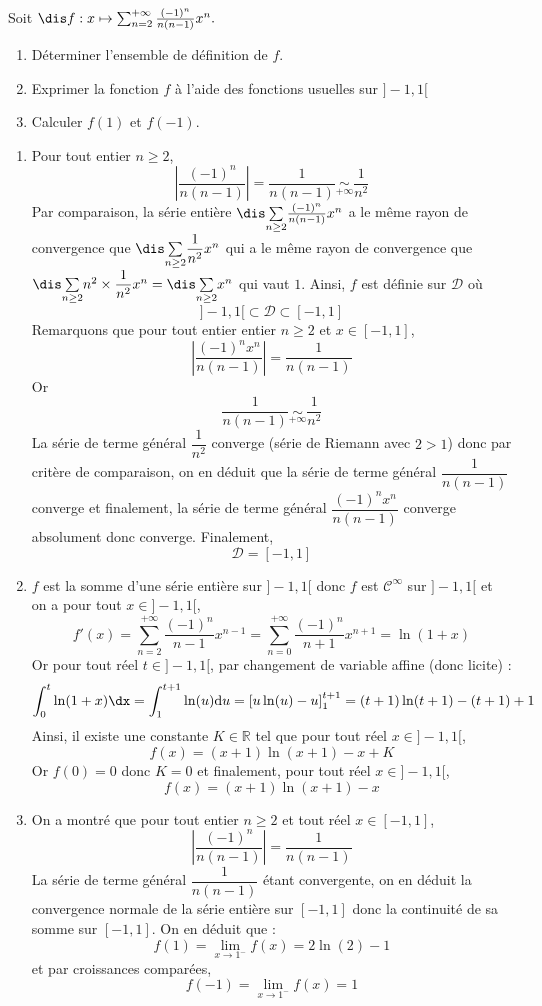\documentclass[a4paper,10pt]{report}
\newcommand{\Sum}[2]{\ensuremath{\textstyle{\sum\limits_{#1}^{#2}}}}
\begin{document}
\begin{Exercice}{} Soit $\dis f : x \mapsto \sum_{n = 2}^{ + \infty} \frac{( - 1)^{n}}{n(n - 1)}x^{n}.$

  \begin{enumerate}
  \item
    Déterminer l'ensemble de définition de $f$.
  \item
    Exprimer la fonction $f$ à l'aide des fonctions usuelles sur $] - 1,1[$
  \item Calculer $f(1)$ et $f( - 1)$.
  \end{enumerate}
  \end{Exercice} 
  
  \corr 
  
  
  \begin{enumerate}
  \item Pour tout entier $n \geq 2$,
  $$ \left\vert \frac{( - 1)^{n}}{n(n - 1)} \right\vert = \dfrac{1}{n(n-1)} \underset{+ \infty}{\sim} \dfrac{1}{n^2}$$
Par comparaison, la série entière $\dis \Sum{n \geq 2}{} \frac{( - 1)^{n}}{n(n - 1)}x^{n}$ a le même rayon de convergence que $\dis \Sum{n \geq 2}{} \dfrac{1}{n^2}x^{n}$ qui a le même rayon de convergence que $\dis \Sum{n \geq 2}{} n^2 \times \dfrac{1}{n^2} x^{n} = \dis \Sum{n \geq 2}{} x^n$ qui vaut $1$. Ainsi, $f$ est définie sur $\mathcal{D}$ où
$$ ]-1,1[ \subset \mathcal{D} \subset [-1,1]$$
Remarquons que pour tout entier entier $n \geq 2$ et $x \in [-1,1]$,
$$ \left\vert \dfrac{(-1)^n x^n }{n(n-1)} \right\vert = \dfrac{1}{n(n-1)} $$
Or 
$$ \dfrac{1}{n(n-1)} \underset{+ \infty}{\sim} \dfrac{1}{n^2}$$
La série de terme général $\dfrac{1}{n^2}$ converge (série de Riemann avec $2>1$) donc par critère de comparaison, on en déduit que la série de terme général $\dfrac{1}{n(n-1)}$ converge et finalement, la série de terme général $ \dfrac{(-1)^n x^n }{n(n-1)}$ converge absolument donc converge. Finalement,
$$ \mathcal{D} = [-1,1]$$
\item $f$ est la somme d'une série entière sur $]-1,1[$ donc $f$ est $\mathcal{C}^{\infty}$ sur $]-1,1[$ et on a pour tout $x \in ]-1,1[$,
$$ f'(x) = \sum_{n=2}^{+ \infty} \dfrac{(-1)^n}{n-1} x^{n-1} =  \sum_{n=0}^{+ \infty} \dfrac{(-1)^{n}}{n+1} x^{n+1} = \ln(1+x)$$
Or pour tout réel $t \in ]-1,1[$, par changement de variable affine (donc licite) :
$$ \int_0^t \ln(1+x) \dx = \int_1^{t+1} \ln(u) \textrm{d}u = \left[ u \ln(u)-u \right]_1^{t+1} = (t+1)\ln(t+1)-(t+1) +1$$
Ainsi, il existe une constante $K \in \mathbb{R}$ tel que pour tout réel $x \in ]-1,1[$,
$$ f(x) = (x+1) \ln(x+1) - x + K$$
Or $f(0)=0$ donc $K=0$ et finalement, 
pour tout réel $x \in ]-1,1[$,
$$ f(x) = (x+1) \ln(x+1) - x $$
  \item On a montré que pour tout entier $n \geq 2$ et tout réel $x \in [-1,1]$,
  $$ \left\vert \frac{( - 1)^{n}}{n(n - 1)} \right\vert = \dfrac{1}{n(n-1)}$$
La série de terme général $\dfrac{1}{n(n-1)}$ étant convergente, on en déduit la convergence normale de la série entière sur $[-1,1]$ donc la continuité de sa somme sur $[-1,1]$. On en déduit que :
$$ f(1) = \lim_{x \rightarrow 1^{-}} f(x) =  2 \ln(2)-1$$
et par croissances comparées,
$$ f(-1) = \lim_{x \rightarrow 1^{-}} f(x) =  1$$
  \end{enumerate}
  
\end{document}

